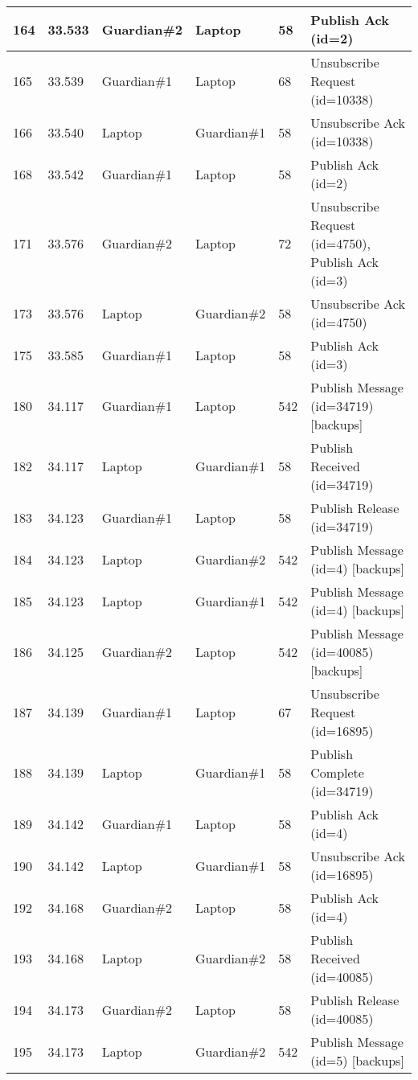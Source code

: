\begin{table}[!ht]
\begin{tabular}{|l|l|l|l|l|l|}
        164 & 33.533 & Guardian\#2 & Laptop & 58 & Publish Ack (id=2) \\ \hline
        165 & 33.539 & Guardian\#1 & Laptop & 68 & Unsubscribe Request (id=10338) \\ \hline
        166 & 33.540 & Laptop & Guardian\#1 & 58 & Unsubscribe Ack (id=10338) \\ \hline
        168 & 33.542 & Guardian\#1 & Laptop & 58 & Publish Ack (id=2) \\ \hline
        171 & 33.576 & Guardian\#2 & Laptop & 72 & Unsubscribe Request (id=4750), Publish Ack (id=3) \\ \hline
        173 & 33.576 & Laptop & Guardian\#2 & 58 & Unsubscribe Ack (id=4750) \\ \hline
        175 & 33.585 & Guardian\#1 & Laptop & 58 & Publish Ack (id=3) \\ \hline
        180 & 34.117 & Guardian\#1 & Laptop & 542 & Publish Message (id=34719) [backups] \\ \hline
        182 & 34.117 & Laptop & Guardian\#1 & 58 & Publish Received (id=34719) \\ \hline
        183 & 34.123 & Guardian\#1 & Laptop & 58 & Publish Release (id=34719) \\ \hline
        184 & 34.123 & Laptop & Guardian\#2 & 542 & Publish Message (id=4) [backups] \\ \hline
        185 & 34.123 & Laptop & Guardian\#1 & 542 & Publish Message (id=4) [backups] \\ \hline
        186 & 34.125 & Guardian\#2 & Laptop & 542 & Publish Message (id=40085) [backups] \\ \hline
        187 & 34.139 & Guardian\#1 & Laptop & 67 & Unsubscribe Request (id=16895) \\ \hline
        188 & 34.139 & Laptop & Guardian\#1 & 58 & Publish Complete (id=34719) \\ \hline
        189 & 34.142 & Guardian\#1 & Laptop & 58 & Publish Ack (id=4) \\ \hline
        190 & 34.142 & Laptop & Guardian\#1 & 58 & Unsubscribe Ack (id=16895) \\ \hline
        192 & 34.168 & Guardian\#2 & Laptop & 58 & Publish Ack (id=4) \\ \hline
        193 & 34.168 & Laptop & Guardian\#2 & 58 & Publish Received (id=40085) \\ \hline
        194 & 34.173 & Guardian\#2 & Laptop & 58 & Publish Release (id=40085) \\ \hline
        195 & 34.173 & Laptop & Guardian\#2 & 542 & Publish Message (id=5) [backups] \\ \hline

\end{tabular}
\end{table}
